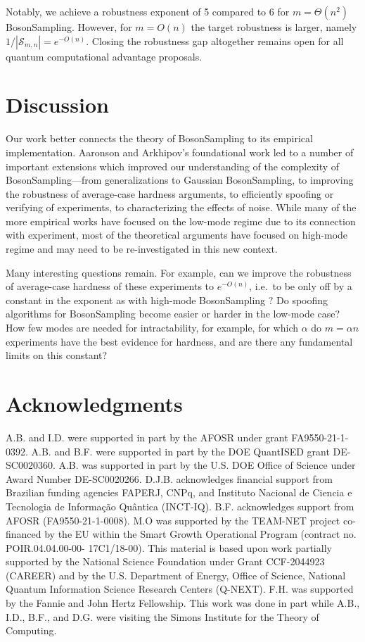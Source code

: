 \documentclass[11pt]{article}
\theoremstyle{plain}
\theoremstyle{plain}
\theoremstyle{plain}
\theoremstyle{plain}
\theoremstyle{plain}
\theoremstyle{plain}
\theoremstyle{plain}
\theoremstyle{remark}
\theoremstyle{remark}
\theoremstyle{plain}
\theoremstyle{plain}
\theoremstyle{plain}
\theoremstyle{plain}
\newcommand{\Smn}{\mathcal{S}_{m,n}}
\begin{document}
Notably, we achieve a robustness exponent of 5 compared to 6 for $m=\Theta(n^2)$ BosonSampling. However, for $m=O(n)$ the target robustness is larger, namely $1/|\Smn| = e^{-O(n)}.$ Closing the robustness gap altogether remains open for all quantum computational advantage proposals. 

\section{Discussion}

Our work better connects the theory of BosonSampling to its empirical implementation.
Aaronson and Arkhipov's foundational work led to a number of important extensions which improved our understanding of the complexity of BosonSampling---from generalizations to Gaussian BosonSampling, to improving the robustness of average-case hardness arguments, to efficiently spoofing or verifying of experiments, to characterizing the effects of noise. 
While many of the more empirical works have focused on the low-mode regime due to its connection with experiment, most of the theoretical arguments have  focused on high-mode regime and may need to be re-investigated in this new context.

Many interesting questions remain.
For example, can we improve the robustness of average-case hardness of these experiments to $e^{-O(n)}$, i.e.\ to be only off by a constant in the exponent as with high-mode BosonSampling \cite{Bouland2021}?
Do spoofing algorithms for BosonSampling become easier or harder in the low-mode case?
How few modes are needed for intractability, for example, for which $\alpha$ do $m=\alpha n$ experiments have the best evidence for hardness,
and are there any fundamental limits on this constant? 

\section*{Acknowledgments}
A.B. and I.D. were supported in part by the AFOSR under grant FA9550-21-1-0392.
A.B. and B.F. were supported in part by the DOE QuantISED grant DE-SC0020360. 
A.B. was supported in part by the U.S. DOE Office of Science under Award Number DE-SC0020266.
D.J.B. acknowledges financial support from Brazilian funding agencies FAPERJ, CNPq, and Instituto Nacional de
Ciencia e Tecnologia de Informa\c{c}\~ao Qu\^antica (INCT-IQ).
B.F. acknowledges support from AFOSR (FA9550-21-1-0008). M.O was  supported by the TEAM-NET project
co-financed by the EU within the Smart Growth Operational Program (contract no. POIR.04.04.00-00-
17C1/18-00).  This material is based upon work partially
supported by the National Science Foundation under Grant CCF-2044923 (CAREER) and by the U.S. Department of Energy, Office of Science, National Quantum Information Science Research Centers (Q-NEXT).
F.H. was supported by the Fannie and John Hertz Fellowship.
This work was done in part while A.B., I.D., B.F., and D.G. were visiting the Simons Institute for the Theory of Computing.
\end{document}
